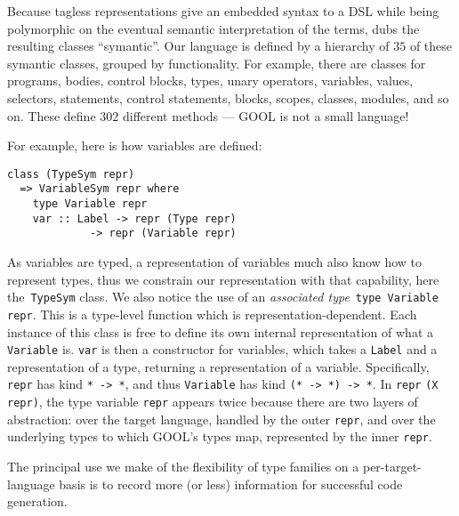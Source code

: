\documentclass[sigplan,review,anonymous,prologue,dvipsnames]{acmart}
\begin{document}
Because tagless representations give an embedded syntax to a DSL while
being polymorphic on the eventual semantic interpretation of the terms,
\cite{carette2009finally} dubs the resulting classes ``symantic''.
Our language is defined by a hierarchy of $35$ of these symantic classes,
grouped by functionality.  For example, there are classes for programs,
bodies, control blocks, types, unary operators, variables, values, selectors,
statements, control statements, blocks, scopes, classes, modules, and so
on.  These define $302$ different methods --- GOOL is not a small language!


For example, here is how variables are defined:
\begin{lstlisting}
class (TypeSym repr)
  => VariableSym repr where
    type Variable repr
    var :: Label -> repr (Type repr)
             -> repr (Variable repr)
\end{lstlisting}
As variables are typed, a representation of variables much also know how
to represent types, thus we constrain our representation with that capability,
here the~\verb|TypeSym| class.  We also notice the use of an
\emph{associated type}~\verb|type Variable repr|. This is a type-level
function which is representation-dependent.  Each instance of this class
is free to define its own internal representation of what a
\verb|Variable| is. \verb|var| is then a constructor for variables,
which takes a \verb|Label| and a representation of a type, returning
a representation of a variable.  Specifically, \verb|repr| has kind
\verb|* -> *|, and thus \verb|Variable| has kind \verb|(* -> *) -> *|.
In \verb|repr| \verb|(X repr)|, the type variable \verb|repr| appears
twice because there are two layers of abstraction: over the target
language, handled by the outer \verb|repr|, and over the underlying
types to which GOOL's types map, represented by the inner \verb|repr|.

The principal use we make of the flexibility of type families on a
per-target-language basis is to record more (or less) information for
successful code generation.  
\end{document}
